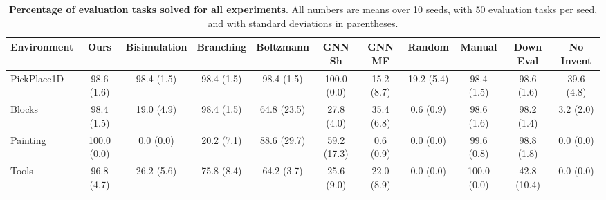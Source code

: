 \begin{table}[t]
	\centering
	\scriptsize
	
	\begin{tabular}{| l | c || c | c | c | c | c | c || c | c | c | }
	\hline
	{\bf{Environment}} &{\bf{Ours}} &
	{\bf{Bisimulation}} &
	{\bf{Branching}} &
	{\bf{Boltzmann}} &
	{\bf{GNN Sh}} &
	{\bf{GNN MF}} &
	{\bf{Random}} &
	{\bf{Manual}} &
	{\bf{Down Eval}} &
	{\bf{No Invent}} \\
	\hline
	PickPlace1D & 98.6 (1.6) & 98.4 (1.5) & 98.4 (1.5) & 98.4 (1.5) & 100.0 (0.0) & 15.2 (8.7) & 19.2 (5.4) & 98.4 (1.5) & 98.6 (1.6) & 39.6 (4.8) \\
	Blocks & 98.4 (1.5) & 19.0 (4.9) & 98.4 (1.5) & 64.8 (23.5) & 27.8 (4.0) & 35.4 (6.8) & 0.6 (0.9) & 98.6 (1.6) & 98.2 (1.4) & 3.2 (2.0) \\
	Painting & 100.0 (0.0) & 0.0 (0.0) & 20.2 (7.1) & 88.6 (29.7) & 59.2 (17.3) & 0.6 (0.9) & 0.0 (0.0) & 99.6 (0.8) & 98.8 (1.8) & 0.0 (0.0) \\
	Tools & 96.8 (4.7) & 26.2 (5.6) & 75.8 (8.4) & 64.2 (3.7) & 25.6 (9.0) & 22.0 (8.9) & 0.0 (0.0) & 100.0 (0.0) & 42.8 (10.4) & 0.0 (0.0) \\\hline

	\end{tabular}
	\caption{\textbf{Percentage of evaluation tasks solved for all experiments}. All numbers are means over 10 seeds, with 50 evaluation tasks per seed, and with standard deviations in parentheses.}
	\label{tab:allsuccresults}
\end{table}